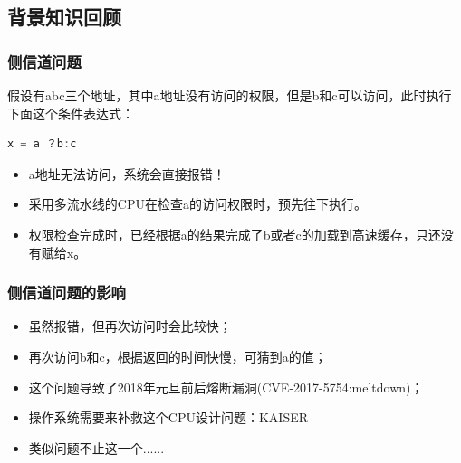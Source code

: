 \subsection{背景知识回顾} %
\begin{frame}[fragile]
    \frametitle{侧信道问题}
    \begin{block}{}
    假设有abc三个地址，其中a地址没有访问的权限，但是b和c可以访问，此时执行下面这个条件表达式：
    \begin{lstlisting}[language = C]
        x = a ？b:c
    \end{lstlisting}
    \end{block} \pause
	    \begin{itemize}
	        \item a地址无法访问，系统会直接报错！ \pause
	        \item 采用多流水线的CPU在检查a的访问权限时，预先往下执行。 \pause
	        \item 权限检查完成时，已经根据a的结果完成了b或者c的加载到高速缓存，只还没有赋给x。
	    \end{itemize}
\end{frame}
\begin{frame}[fragile]
    \frametitle{侧信道问题的影响}
	    \begin{itemize}
	        \item 虽然报错，但再次访问时会比较快；
	        \item 再次访问b和c，根据返回的时间快慢，可猜到a的值； \pause
	        \item 这个问题导致了2018年元旦前后熔断漏洞(CVE-2017-5754:meltdown)； \pause
	        \item 操作系统需要来补救这个CPU设计问题：KAISER \pause
	        \item 类似问题不止这一个......
	    \end{itemize}
\end{frame}

